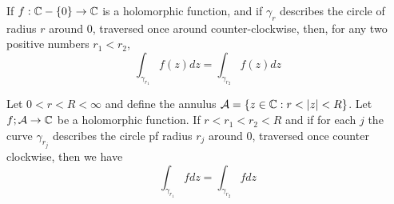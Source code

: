 \begin{proposition}
If $f:\mathbb{C}-\{0\} \to \mathbb{C}$ is a holomorphic function, and if $\gamma_r$ describes the circle of radius $r$ around $0$, traversed once around counter-clockwise, then, for any two positive numbers $r_1<r_2$,
\[\int_{\gamma_{r_1}} f(z)dz = \int_{\gamma_{r_2}} f(z)dz\]
\end{proposition}

\begin{proposition}
    Let $0<r<R<\infty$ and define the annulus $\mathcal{A} = \{z\in\mathbb{C}: r < |z| < R\}$. Let $f;\mathcal{A}\to\mathbb{C}$ be a holomorphic function. If $r<r_1<r_2<R$ and if for each $j$ the curve $\gamma_{r_j}$ describes the circle pf radius $r_j$ around $0$, traversed once counter clockwise, then we have 
    \[
    \int_{\gamma_{r_1}}fdz = \int_{\gamma_{r_2}}fdz
    \]
\end{proposition}

\newpage

